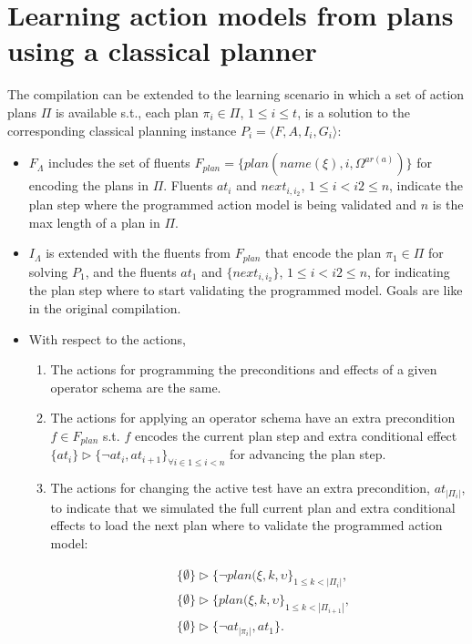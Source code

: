 \documentclass[letterpaper]{article} %
\newcommand{\tup}[1]{{\langle #1 \rangle}}
\begin{document}
\section{Learning action models from plans using a classical planner}
The compilation can be extended to the learning scenario in which a set of action plans $\Pi$ is available s.t., each plan $\pi_i\in \Pi$, {\small $1\leq i\leq t$}, is a solution to the corresponding classical planning instance $P_i=\tup{F,A,I_i,G_i}$:
\begin{itemize}
\item $F_{\Lambda}$ includes the set of fluents $F_{plan}=\{plan(name(\xi),i,\Omega^{ar(a)})\}$ for encoding the plans in $\Pi$. Fluents $at_i$ and $next_{i,i_2}$, {\small $1\leq i<i2\leq n$}, indicate the plan step where the programmed action model is being validated and $n$ is the max length of a plan in $\Pi$.
\item $I_{\Lambda}$ is extended with the fluents from $F_{plan}$ that encode the plan $\pi_1\in \Pi$ for solving $P_1$, and the fluents $at_1$ and $\{next_{i,i_2}\}$, {\small $1\leq i<i2\leq n$}, for indicating the plan step where to start validating the programmed model. Goals are like in the original compilation.
\item With respect to the actions,
\begin{enumerate}
\item The actions for programming the preconditions and effects of a given operator schema are the same.
\item The actions for applying an operator schema have an extra precondition $f\in F_{plan}$ s.t. $f$ encodes the current plan step and extra conditional effect $\{at_{i}\}\rhd\{\neg at_{i},at_{i+1}\}_{\forall i\in 1\leq i< n}$ for advancing the plan step.
\item The actions for changing the active test have an extra precondition, $at_{|\Pi_i|}$, to indicate that we simulated the full current plan and extra conditional effects to load the next plan where to validate the programmed action model:
\begin{small}
\begin{align*}
&\{\emptyset\}\rhd\{\neg plan(\xi,k,\upsilon\}_{1\leq k<|\Pi_i|},\\
&\{\emptyset\}\rhd\{plan(\xi,k,\upsilon\}_{1\leq k<|\Pi_{i+1}|},\\
&\{\emptyset\}\rhd\{\neg at_{|\pi_i|},at_1\}.
\end{align*}
\end{small}
\end{enumerate}
\end{itemize}
\end{document}
